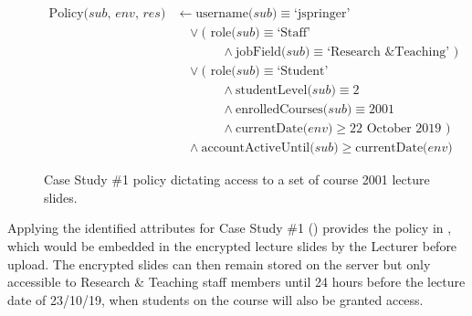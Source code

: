 \begin{figure}[ht]
  \centering
\begin{align*}
  \text{Policy($sub$, $env$, $res$)}
  &
    \leftarrow
    \text{username($sub$)} \equiv \text{`jspringer'}
  \\
  &
    \phantom{::}\vee
    \text{( role($sub$)} \equiv \text{`Staff'}
  \\
  &
    \phantom{::::::::}\wedge
    \text{jobField($sub$)} \equiv \text{`Research \& Teaching' )}
  \\
  &
    \phantom{::}\vee
    \text{( role($sub$)} \equiv \text{`Student'}
  \\
  &
    \phantom{::::::::}\wedge
    \text{studentLevel($sub$)} \equiv \text{2}
  \\
  &
    \phantom{::::::::}\wedge
    \text{enrolledCourses($sub$)} \equiv \text{2001}
  \\
  &
    \phantom{::::::::}\wedge
    \text{currentDate($env$)} \geq \text{22 October 2019 )}
  \\
  &
    \phantom{::}\wedge
    \text{accountActiveUntil($sub$)} \geq \text{currentDate($env$)}
\end{align*}
  \caption{
    \label{fig:case_study_policy_1}
    Case Study \#1 policy dictating access to a set of course 2001 lecture slides.
  }
\end{figure}
Applying the identified attributes for Case Study \#1 () provides the \thePolicyLang policy in , which would be embedded in the encrypted lecture slides by the Lecturer before upload. The encrypted slides can then remain stored on the server but only accessible to Research \& Teaching staff members until 24 hours before the lecture date of 23/10/19, when students on the course will also be granted access.
